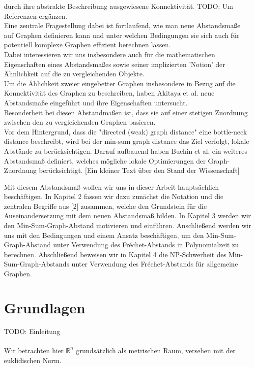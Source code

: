 \documentclass[a4paper, 12pt, twoside]{article}
\theoremstyle{Format1} %
\begin{document}
durch ihre abstrakte Beschreibung ausgewiesene Konnektivität.
TODO: Um Referenzen ergänzen.
\\
Eine zentrale Fragestellung dabei ist fortlaufend, wie man neue Abstandsmaße auf Graphen definieren kann und unter welchen Bedingungen sie sich auch für potentiell komplexe Graphen effizient berechnen lassen.
\\
Dabei interessieren wir uns insbesondere auch für die mathematischen Eigenschaften eines Abstandsmaßes sowie seiner implizierten 'Notion' der Ähnlichkeit auf die zu vergleichenden Objekte.
\\
Um die Ählichkeit zweier eingebetter Graphen insbesondere in Bezug auf die Konnektivität des Graphen zu beschreiben, haben Akitaya et al. \cite{Akitaya} neue Abstandsmaße eingeführt und ihre Eigenschaften untersucht.
\\
Besonderheit bei diesen Abstandmaßen ist, dass sie auf einer stetigen Zuordnung zwischen den zu vergleichenden Graphen basieren.
\\
Vor dem Hintergrund, dass die "directed (weak) graph distance" eine bottle-neck distance beschreibt, wird bei der min-sum graph distance das Ziel verfolgt, lokale Abstände zu berücksichtigen.
Darauf aufbauend haben \cite{Buchin} Buchin et al. ein weiteres Abstandsmaß definiert, welches mögliche lokale Optimierungen der Graph-Zuordnung berücksichtigt.
[Ein kleiner Text über den Stand der Wissenschaft]

Mit diesem Abstandsmaß wollen wir uns in dieser Arbeit hauptsächlich beschäftigen.
In Kapitel 2 fassen wir dazu zunächst die Notation und die zentralen Begriffe aus [2] zusammen, welche den Grundstein für die Auseinandersetzung mit dem neuen Abstandsmaß bilden.
In Kapitel 3 werden wir den Min-Sum-Graph-Abstand motivieren und einführen. Anschließend werden wir uns mit den Bedingungen und einem Ansatz beschäftigen, um den Min-Sum-Graph-Abstand
unter Verwendung des Fréchet-Abstands in Polynomialzeit zu berechnen.
Abschließend beweisen wir in Kapitel 4 die NP-Schwerheit des Min-Sum-Graph-Abstands unter Verwendung des Fréchet-Abstands für allgemeine Graphen.
\newpage

\section{Grundlagen}
TODO: Einleitung
\\
\\
Wir betrachten hier $ \mathbb{R}^n $ grundsätzlich als metrischen Raum, versehen mit der euklidischen Norm.
\end{document}
